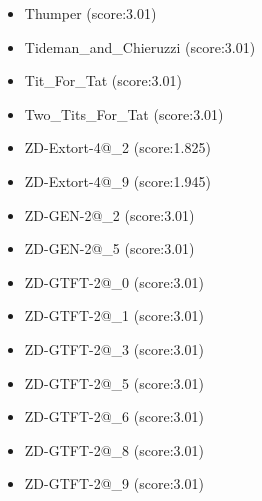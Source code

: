 \begin{appendices}
\begin{itemize}
\begin{multicols}{3}
\begin{itemize}
                \item Thumper (score:3.01)
                \item Tideman\_and\_Chieruzzi (score:3.01)
                \item Tit\_For\_Tat (score:3.01)
                \item Two\_Tits\_For\_Tat (score:3.01)
                \item ZD-Extort-4@\_2 (score:1.825)
                \item ZD-Extort-4@\_9 (score:1.945)
                \item ZD-GEN-2@\_2 (score:3.01)
                \item ZD-GEN-2@\_5 (score:3.01)
                \item ZD-GTFT-2@\_0 (score:3.01)
                \item ZD-GTFT-2@\_1 (score:3.01)
                \item ZD-GTFT-2@\_3 (score:3.01)
                \item ZD-GTFT-2@\_5 (score:3.01)
                \item ZD-GTFT-2@\_6 (score:3.01)
                \item ZD-GTFT-2@\_8 (score:3.01)
                \item ZD-GTFT-2@\_9 (score:3.01)
            \end{itemize}
        \end{multicols}


\end{itemize}
\end{appendices}
